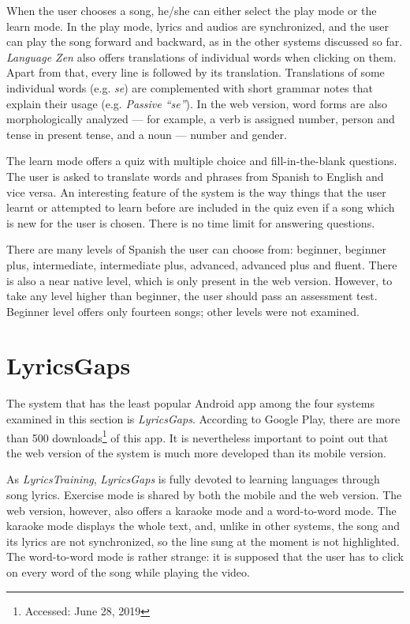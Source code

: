 When the user chooses a song, he/she can either select the play mode or the learn mode. In the play mode, lyrics and audios are synchronized, and the user can play the song forward and backward, as in the other systems discussed so far. \textit{Language Zen} also offers translations of individual words when clicking on them. Apart from that, every line is followed by its translation. Translations of some individual words (e.g. \textit{se}) are complemented with short grammar notes that explain their usage (e.g. \textit{Passive ``se''}). In the web version, word forms are also morphologically analyzed --- for example, a verb is assigned number, person and tense in present tense, and a noun --- number and gender.

The learn mode offers a quiz with multiple choice and fill-in-the-blank questions. The user is asked to translate words and phrases from Spanish to English and vice versa. An interesting feature of the system is the way things that the user learnt or attempted to learn before are included in the quiz even if a song which is new for the user is chosen. There is no time limit for answering questions.

There are many levels of Spanish the user can choose from: beginner, beginner plus, intermediate, intermediate plus, advanced, advanced plus and fluent. There is also a near native level, which is only present in the web version. However, to take any level higher than beginner, the user should pass an assessment test. Beginner level offers only fourteen songs; other levels were not examined. 

\section{LyricsGaps}

The system that has the least popular Android app among the four systems examined in this section is \textit{LyricsGaps}. According to Google Play, there are more than 500 downloads\footnote{Accessed: June 28, 2019} of this app. It is nevertheless important to point out that the web version of the system is much more developed than its mobile version. 

As \textit{LyricsTraining}, \textit{LyricsGaps} is fully devoted to learning languages through song lyrics. Exercise mode is shared by both the mobile and the web version. The web version, however, also offers a karaoke mode and a word-to-word mode. The karaoke mode displays the whole text, and, unlike in other systems, the song and its lyrics are not synchronized, so the line sung at the moment is not highlighted. The word-to-word mode is rather strange: it is supposed that the user has to click on every word of the song while playing the video.

